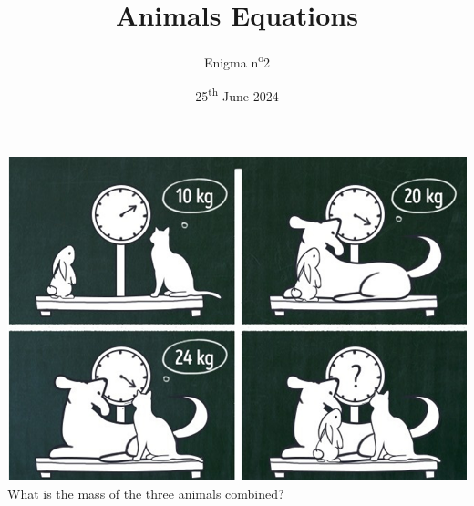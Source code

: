 \documentclass[a4paper, top=10mm]{article}
\title{\textbf{\huge{Animals Equations}}}
\author{Enigma n\textsuperscript{o}2}
\date{25\textsuperscript{th} June 2024}
\begin{document}
	\maketitle
	
	\vspace{1cm}
	
	\begin{center}
		\includegraphics[width=\linewidth]{02image.png}\\
		What is the mass of the three animals combined?
	\end{center}
	
\end{document}
